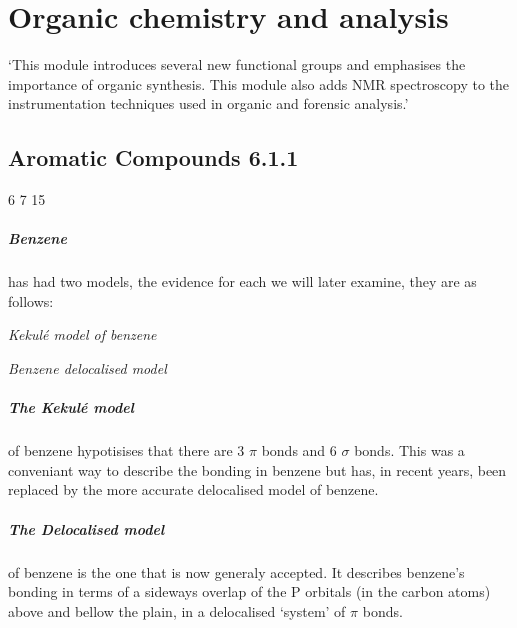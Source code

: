 \chapter{Organic chemistry and analysis}
`This module introduces several new functional groups
and emphasises the importance of organic synthesis.
This module also adds NMR spectroscopy to the instrumentation techniques used in organic and forensic analysis.'

\section{Aromatic Compounds 6.1.1}

6 \setbondoffset{0pt}
7 
15 \vspace{7mm}

	\paragraph{Benzene} has had two models, the evidence for each we will later examine, they are as follows:
	\begin{center}

	\textit{Kekul\'{e} model of benzene}
	
	\vspace{7mm}	
	

	\textit{Benzene delocalised model}
	\end{center}
	
	\paragraph{The Kekul\'{e} model} of benzene hypotisises that there are 3 $\pi$ bonds and 6 $\sigma$ bonds.
	This was a conveniant way to describe the bonding in benzene but has, in recent years, been replaced by the more accurate delocalised model of benzene.
	
	\paragraph{The Delocalised model} of benzene is the one that is now generaly accepted. 
	It describes benzene's bonding in terms of a sideways overlap of the P orbitals (in the carbon atoms) above and bellow the plain, in a delocalised `system' of $\pi$ bonds.
	
